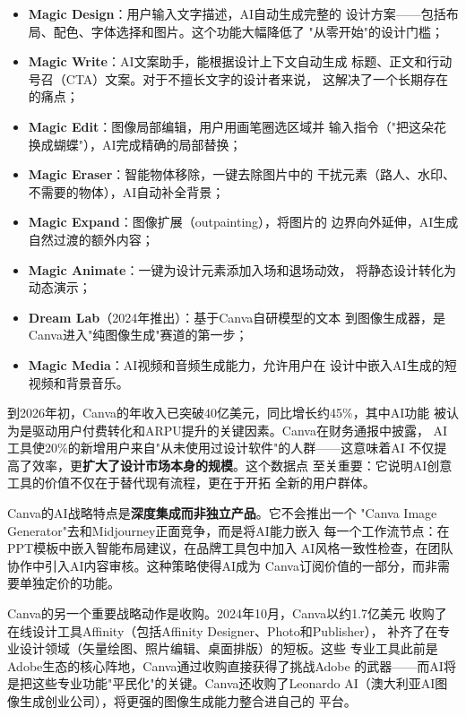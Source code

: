 \begin{itemize}
  \item \textbf{Magic Design}：用户输入文字描述，AI自动生成完整的
    设计方案——包括布局、配色、字体选择和图片。这个功能大幅降低了
    "从零开始"的设计门槛；
  \item \textbf{Magic Write}：AI文案助手，能根据设计上下文自动生成
    标题、正文和行动号召（CTA）文案。对于不擅长文字的设计者来说，
    这解决了一个长期存在的痛点；
  \item \textbf{Magic Edit}：图像局部编辑，用户用画笔圈选区域并
    输入指令（"把这朵花换成蝴蝶"），AI完成精确的局部替换；
  \item \textbf{Magic Eraser}：智能物体移除，一键去除图片中的
    干扰元素（路人、水印、不需要的物体），AI自动补全背景；
  \item \textbf{Magic Expand}：图像扩展（outpainting），将图片的
    边界向外延伸，AI生成自然过渡的额外内容；
  \item \textbf{Magic Animate}：一键为设计元素添加入场和退场动效，
    将静态设计转化为动态演示；
  \item \textbf{Dream Lab}（2024年推出）：基于Canva自研模型的文本
    到图像生成器，是Canva进入"纯图像生成"赛道的第一步；
  \item \textbf{Magic Media}：AI视频和音频生成能力，允许用户在
    设计中嵌入AI生成的短视频和背景音乐。
\end{itemize}

到2026年初，Canva的年收入已突破40亿美元，同比增长约45\%，其中AI功能
被认为是驱动用户付费转化和ARPU提升的关键因素。Canva在财务通报中披露，
AI工具使20\%的新增用户来自"从未使用过设计软件"的人群——这意味着AI
不仅提高了效率，更\textbf{扩大了设计市场本身的规模}。这个数据点
至关重要：它说明AI创意工具的价值不仅在于替代现有流程，更在于开拓
全新的用户群体。

Canva的AI战略特点是\textbf{深度集成而非独立产品}。它不会推出一个
"Canva Image Generator"去和Midjourney正面竞争，而是将AI能力嵌入
每一个工作流节点：在PPT模板中嵌入智能布局建议，在品牌工具包中加入
AI风格一致性检查，在团队协作中引入AI内容审核。这种策略使得AI成为
Canva订阅价值的一部分，而非需要单独定价的功能。

Canva的另一个重要战略动作是收购。2024年10月，Canva以约1.7亿美元
收购了在线设计工具Affinity（包括Affinity Designer、Photo和Publisher），
补齐了在专业设计领域（矢量绘图、照片编辑、桌面排版）的短板。这些
专业工具此前是Adobe生态的核心阵地，Canva通过收购直接获得了挑战Adobe
的武器——而AI将是把这些专业功能"平民化"的关键。Canva还收购了Leonardo
AI（澳大利亚AI图像生成创业公司），将更强的图像生成能力整合进自己的
平台。

